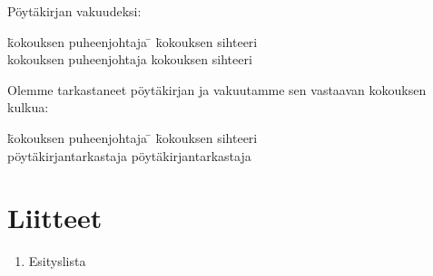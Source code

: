 \documentclass[a4paper,finnish]{article}
\begin{document}
\begin{minipage}{\textwidth}
Pöytäkirjan vakuudeksi:

\vspace*{1.5cm}

\begin{tabbing}
\hspace*{1.5cm}\=kokouksen puheenjohtaja \= \hspace{1cm} \= kokouksen
sihteeri\kill
\> \usebox{\puhis} \> \> \usebox{\sihteeri}\\
\> kokouksen puheenjohtaja \> \> kokouksen sihteeri
\end{tabbing}

Olemme tarkastaneet pöytäkirjan ja vakuutamme sen vastaavan kokouksen kulkua:\\

\vspace*{1.5cm}

\begin{tabbing}
\hspace*{1.5cm}\=kokouksen puheenjohtaja \= \hspace{1cm} \= kokouksen
sihteeri\kill
\> \usebox{\tark} \> \> \usebox{\tokatark}\\
\> pöytäkirjantarkastaja \> \> pöytäkirjantarkastaja
\end{tabbing}
\end{minipage}

\section*{Liitteet}
\begin{enumerate}
\item Esityslista
\end{enumerate}
\end{document}
